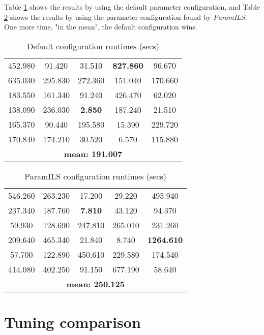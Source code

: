 Table \ref{table:testcabad} shows the results by using the default parameter configuration, and Table \ref{table:testcagood} shows the results by using the parameter configuration found by {\it ParamILS}. One more time, "in the mean", the default configuration wins.

\begin{table}[H]
\caption{Default configuration runtimes (secs)}
\centering
\renewcommand{\arraystretch}{1.2}
\begin{tabular}{|ccccc|}
	\hline
	452.980 & 91.420 & 31.510 & \textcolor{intenso}{\bf 827.860} & 96.670 \\ 
	635.030 & 295.830 & 272.360 & 151.040 & 170.660 \\  
	\hline 
	183.550 & 161.340 & 91.240 & 426.470 & 62.020 \\ 
	138.090 & 236.030 & \textcolor{naranja}{\bf 2.850} & 187.240 & 21.510 \\  
	\hline 
	165.370 & 90.440 & 195.580 & 15.390 & 229.720 \\ 
	170.840 & 174.210 & 30.520 & 6.570 & 115.880 \\  
	\hline
	\multicolumn{5}{|c|}{\bf mean: 191.007}\\
	\hline
\end{tabular}
\label{table:testcabad}
\end{table}

\begin{table}[H]
\caption{ParamILS configuration runtimes (secs)}
\centering
\renewcommand{\arraystretch}{1.2}
\begin{tabular}{|ccccc|}
	\hline
	546.260 & 263.230 & 17.200 & 29.220 & 495.940 \\ 
	237.340 & 187.760 & \textcolor{naranja}{\bf 7.810} & 43.120 & 94.370 \\  
	\hline 
	59.930 & 128.690 & 247.810 & 265.010 & 231.260 \\ 
	209.640 & 465.340 & 21.840 & 8.740 & \textcolor{intenso}{\bf 1264.610} \\  
	\hline 
	57.700 & 122.890 & 450.610 & 229.580 & 174.540 \\ 
	414.080 & 402.250 & 91.150 & 677.190 & 58.640 \\  
	\hline 
	\multicolumn{5}{|c|}{\bf mean: 250.125}\\
	\hline
\end{tabular}
\label{table:testcagood}
\end{table}    

\section{Tuning comparison}

